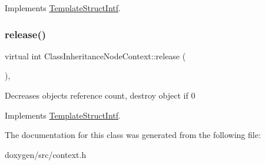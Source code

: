 Implements \mbox{\hyperlink{class_template_struct_intf_a3d610cb81b4adbb531ebed3aa3d09b51}{Template\+Struct\+Intf}}.

\mbox{\label{class_class_inheritance_node_context_adb0ebd43b613667b492399bbeef87ef1}} 
\subsubsection{\texorpdfstring{release()}{release()}}
{\footnotesize\ttfamily virtual int Class\+Inheritance\+Node\+Context\+::release (\begin{DoxyParamCaption}{ }\end{DoxyParamCaption})\hspace{0.3cm}{\ttfamily [inline]}, {\ttfamily [virtual]}}

Decreases object\textquotesingle{}s reference count, destroy object if 0 

Implements \mbox{\hyperlink{class_template_struct_intf_a3dce7dd29d3f66a8080b40578e8a5045}{Template\+Struct\+Intf}}.



The documentation for this class was generated from the following file\+:\begin{DoxyCompactItemize}
\item 
doxygen/src/context.\+h\end{DoxyCompactItemize}
